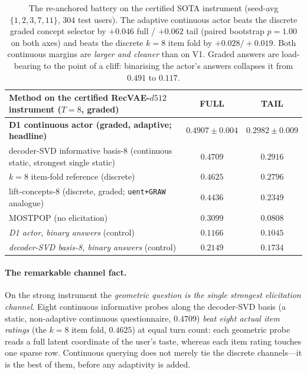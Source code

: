 \documentclass[11pt]{article}
\begin{document}
\begin{table}[h]\centering
\begin{tabular}{lcc}
\toprule
Method on the certified RecVAE-$d512$ instrument ($T{=}8$, graded) & FULL & TAIL \\
\midrule
\textbf{D1 continuous actor (graded, adaptive; headline)} & $\mathbf{0.4907\pm0.004}$ & $\mathbf{0.2982\pm0.009}$ \\
decoder-SVD informative basis-8 (continuous static, strongest single static) & $0.4709$ & $0.2916$ \\
$k{=}8$ item-fold reference (discrete) & $0.4625$ & $0.2796$ \\
lift-concepts-8 (discrete, graded; \texttt{uent+GRAW} analogue) & $0.4436$ & $0.2349$ \\
MOSTPOP (no elicitation) & $0.3099$ & $0.0808$ \\
\midrule
\emph{D1 actor, binary answers} (control) & $0.1166$ & $0.1045$ \\
\emph{decoder-SVD basis-8, binary answers} (control) & $0.2149$ & $0.1734$ \\
\bottomrule
\end{tabular}
\caption{The re-anchored battery on the certified SOTA instrument (seed-avg $\{1,2,3,7,11\}$, $304$ test users). The
adaptive continuous actor beats the discrete graded concept selector by $+0.046$ full / $+0.062$ tail (paired bootstrap
$p{=}1.00$ on both axes) and beats the discrete $k{=}8$ item fold by $+0.028/+0.019$. Both continuous margins are
\emph{larger and cleaner} than on V1. Graded answers are load-bearing to the point of a cliff: binarising the actor's
answers collapses it from $0.491$ to $0.117$.}\label{tab:i2main}
\end{table}

\paragraph{The remarkable channel fact.} On the strong instrument the \emph{geometric question is the single strongest
elicitation channel}. Eight continuous informative probes along the decoder-SVD basis (a static, non-adaptive continuous
questionnaire, $0.4709$) \emph{beat eight actual item ratings} (the $k{=}8$ item fold, $0.4625$) at equal turn count:
each geometric probe reads a full latent coordinate of the user's taste, whereas each item rating touches one sparse row.
Continuous querying does not merely tie the discrete channels---it is the best of them, before any adaptivity is added.
\end{document}
